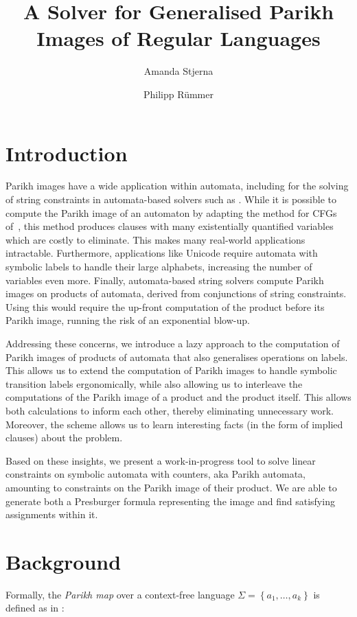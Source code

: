 \documentclass{easychair}
\title{A Solver for Generalised Parikh Images of Regular Languages}
\author{Amanda Stjerna \and Philipp Rümmer}
\institute{Uppsala University, Sweden}
\begin{document}
\maketitle

\section{Introduction}

Parikh images have a wide application within automata, including for the solving
of string constraints in automata-based solvers such as \Ostrich{}
\cite{ostrich}. While it is possible to compute the Parikh image of an automaton
by adapting the method for CFGs of~\cite{generate-parikh-image}, this method
produces clauses with many existentially quantified variables which are costly
to eliminate. This makes many real-world applications intractable. Furthermore,
applications like Unicode require automata with symbolic labels to handle their
large alphabets, increasing the number of variables even more.
Finally, automata-based string solvers compute Parikh images on products of
automata, derived from conjunctions of string constraints. Using
\cite{generate-parikh-image} this would require the up-front computation of the
product before its Parikh image, running the risk of an exponential blow-up.

Addressing these concerns, we introduce a lazy approach to the computation of
Parikh images of products of automata that also generalises operations on
labels. This allows us to extend the computation of Parikh images to handle
symbolic transition labels ergonomically, while also allowing us to interleave
the computations of the Parikh image of a product and the product itself. This
allows both calculations to inform each other, thereby eliminating unnecessary
work. Moreover, the scheme allows us to learn interesting facts (in the form of
implied clauses) about the problem.

Based on these insights, we present a work-in-progress tool to solve linear
constraints on symbolic automata with counters, aka Parikh automata, amounting
to constraints on the Parikh image of their product. We are able to generate
both a Presburger formula representing the image and find satisfying assignments
within it.

\section{Background}

Formally, the \textit{Parikh map} over a context-free language $\Sigma = \left\{a_1, \ldots, a_k \right\}$ is defined as in \cite{kozen}:
\end{document}
